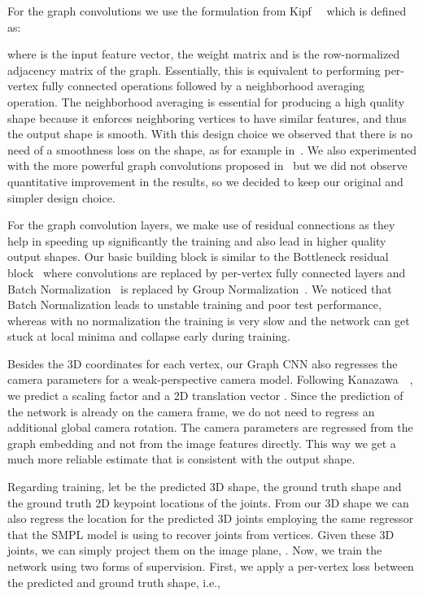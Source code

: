 For the graph convolutions we use the formulation from Kipf~\etal~\cite{kipf2017semi} which is defined as:

where  is the input feature vector,  the weight matrix and  is the row-normalized adjacency matrix of the graph. Essentially, this is equivalent to performing per-vertex fully connected operations followed by a neighborhood averaging operation. The neighborhood averaging is essential for producing a high quality shape because it enforces neighboring vertices to have similar features, and thus the output shape is smooth. With this design choice we observed that there is no need of a smoothness loss on the shape, as for example in~\cite{kato2018renderer}. We also experimented with the more powerful graph convolutions proposed in~\cite{verma2018feastnet} but we did not observe quantitative improvement in the results, so we decided to keep our original and simpler design choice.

For the graph convolution layers, we make use of residual connections as they help in speeding up significantly the training and also lead in higher quality output shapes. Our basic building block is similar to the Bottleneck residual block~\cite{he2016resnet} where  convolutions are replaced by per-vertex fully connected layers and Batch Normalization~\cite{ioffe2015icml} is replaced by Group Normalization~\cite{wu2018eccv}. We noticed that Batch Normalization leads to unstable training and poor test performance, whereas with no normalization the training is very slow and the network can get stuck at local minima and collapse early during training. 

Besides the 3D coordinates for each vertex, our Graph CNN also regresses the camera parameters for a weak-perspective camera model. Following Kanazawa~\etal~\cite{kanazawa2018end}, we predict a scaling factor  and a 2D translation vector . Since the prediction of the network is already on the camera frame, we do not need to regress an additional global camera rotation. The camera parameters are regressed from the graph embedding and not from the image features directly. This way we get a much more reliable estimate that is consistent with the output shape. 

Regarding training, let  be the predicted 3D shape,  the ground truth shape and  the ground truth 2D keypoint locations of the joints. From our 3D shape we can also regress the location for the predicted 3D joints  employing the same regressor that the SMPL model is using to recover joints from vertices. Given these 3D joints, we can simply project them on the image plane, . Now, we train the network using two forms of supervision. First, we apply a per-vertex  loss between the predicted and ground truth shape, i.e.,

